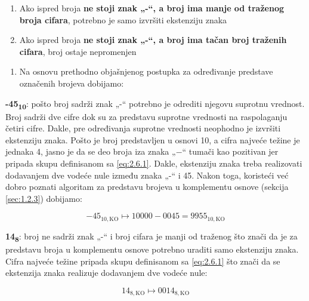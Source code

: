 \documentclass[a4paper,11pt]{article}
\numberwithin{equation}{section}
\begin{document}
\begin{enumerate}[label=\arabic*),start=2,leftmargin=*]
\item Ako ispred broja \textbf{ne stoji znak „-“, a broj ima manje od traženog broja cifara}, potrebno je samo izvršiti ekstenziju znaka

\item Ako ispred broja \textbf{ne stoji znak „-“, a broj ima tačan broj traženih cifara}, broj ostaje nepromenjen

\end{enumerate}


\begin{enumerate}[label=\alph*),start=1,leftmargin=*]
\item Na osnovu prethodno objašnjenog postupka za određivanje predstave označenih brojeva dobijamo:

\end{enumerate}


\textbf{-45\textsubscript{10}}: pošto broj sadrži znak „-“ potrebno je odrediti njegovu suprotnu vrednost. Broj sadrži dve cifre dok su za predstavu suprotne vrednosti na raspolaganju četiri cifre. Dakle, pre određivanja suprotne vrednosti neophodno je izvršiti ekstenziju znaka. Pošto je broj predstavljen u osnovi 10, a cifra najveće težine je jednaka 4, jasno je da se deo broja iza znaka „$-$“ tumači kao pozitivan jer pripada skupu definisanom sa \eqref{eq:2.6.1}. Dakle, ekstenziju znaka treba realizovati dodavanjem dve vodeće nule između znaka „-“ i 45. Nakon toga, koristeći već dobro poznati algoritam za predstavu brojeva u komplementu osnove (sekcija \ref{sec:1.2.3}) dobijamo:



\begin{equation}\label{eq:2.6.3}
- 45_{10,\mathrm{KO}} \longmapsto 10000 - 0045 = 9955_{10,\mathrm{KO}}
\end{equation}


\textbf{14\textsubscript{8}}: broj ne sadrži znak „-“ i broj cifara je manji od traženog što znači da je za predstavu broja u komplementu osnove potrebno uraditi samo ekstenziju znaka. Cifra najveće težine pripada skupu definisanom sa \eqref{eq:2.6.1} što znači da se ekstenzija znaka realizuje dodavanjem dve vodeće nule:



\begin{equation}\label{eq:2.6.4}
14_{8,\mathrm{KO}} \longmapsto 0014_{8,\mathrm{KO}}
\end{equation}
\end{document}
